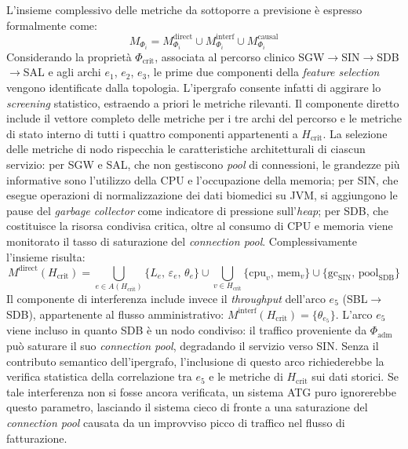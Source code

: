 L'insieme complessivo delle metriche da sottoporre a previsione è espresso formalmente come:
\begin{equation}
\label{eq:m_total}
M_{\Phi_i} = M_{\Phi_i}^{\text{direct}} \cup M_{\Phi_i}^{\text{interf}} \cup M_{\Phi_i}^{\text{causal}}
\end{equation}
Considerando la proprietà $\Phi_{\text{crit}}$, associata al percorso clinico
SGW$\to$SIN$\to$SDB$\to$SAL e agli archi $e_1$, $e_2$, $e_3$, le prime due componenti della
\textit{feature selection} vengono identificate dalla topologia. L'ipergrafo consente infatti di
aggirare lo \textit{screening} statistico, estraendo a priori le metriche rilevanti. Il componente
diretto include il vettore completo delle metriche per i tre archi del percorso e le metriche di
stato interno di tutti i quattro componenti appartenenti a $H_{\text{crit}}$. La selezione delle
metriche di nodo rispecchia le caratteristiche architetturali di ciascun servizio: per SGW e SAL,
che non gestiscono \textit{pool} di connessioni, le grandezze più informative sono l'utilizzo della
\gls{CPU} e l'occupazione della memoria; per SIN, che esegue operazioni di normalizzazione dei dati
biomedici su \gls{JVM}, si aggiungono le pause del \textit{garbage collector} come indicatore di
pressione sull'\textit{heap}; per SDB, che costituisce la risorsa condivisa critica, oltre al
consumo di \gls{CPU} e memoria viene monitorato il tasso di saturazione del \textit{connection
pool}. Complessivamente l'insieme risulta:
\begin{equation}
\label{eq:m_direct_crit}
M^{\text{direct}}(H_{\text{crit}}) =
  \bigcup_{e \in A(H_{\text{crit}})} \{L_e,\, \varepsilon_e,\, \theta_e\}
  \cup \bigcup_{v \in H_{\text{crit}}} \{\text{cpu}_v,\, \text{mem}_v\}
  \cup \{\text{gc}_{\text{SIN}},\, \text{pool}_{\text{SDB}}\}
\end{equation}
Il componente di interferenza include invece il \textit{throughput} dell'arco $e_5$
(SBL$\to$SDB), appartenente al flusso amministrativo: $M^{\text{interf}}(H_{\text{crit}}) =
\{\theta_{e_5}\}$.
L'arco $e_5$ viene incluso in quanto SDB è un nodo condiviso: il traffico proveniente da
$\Phi_{\text{adm}}$ può saturare il suo \textit{connection pool}, degradando il servizio verso SIN.
Senza il contributo semantico dell'ipergrafo, l'inclusione di questo arco richiederebbe la verifica
statistica della correlazione tra $e_5$ e le metriche di $H_{\text{crit}}$ sui dati storici. Se
tale interferenza non si fosse ancora verificata, un sistema \gls{ATG} puro ignorerebbe questo
parametro, lasciando il sistema cieco di fronte a una saturazione del \textit{connection pool}
causata da un improvviso picco di traffico nel flusso di fatturazione.

